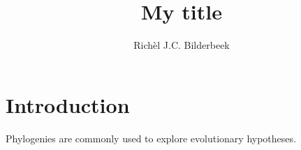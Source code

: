 \documentclass{article}
\title{My title}
\author[1]{Rich\`el J.C. Bilderbeek}
\begin{document}
\maketitle

\section{Introduction}

Phylogenies are commonly used to explore evolutionary hypotheses.
\end{document}
